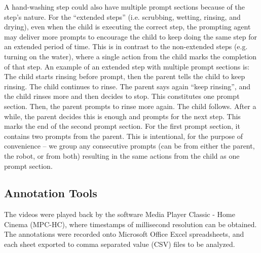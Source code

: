 \documentclass{ut-thesis}
\begin{document}
A hand-washing step could also have multiple prompt sections because of the step's nature.  For the ``extended steps'' (i.e. scrubbing, wetting, rinsing, and drying), even when the child is executing the correct step, the prompting agent may deliver more prompts to encourage the child to keep doing the same step for an extended period of time.  This is in contrast to the non-extended steps (e.g. turning on the water), where a single action from the child marks the completion of that step.  An example of an extended step with multiple prompt sections is: The child starts rinsing before prompt, then the parent tells the child to keep rinsing.  The child continues to rinse.  The parent says again ``keep rinsing'', and the child rinses more and then decides to stop.  This constitutes one prompt section.  Then, the parent prompts to rinse more again.  The child follows.  After a while, the parent decides this is enough and prompts for the next step.  This marks the end of the second prompt section.  For the first prompt section, it contains two prompts from the parent.  This is intentional, for the purpose of convenience -- we group any consecutive prompts (can be from either the parent, the robot, or from both) resulting in the same actions from the child as one prompt section.



\subsection{Annotation Tools}
The videos were played back by the software Media Player Classic - Home Cinema (MPC-HC), where timestamps of millisecond resolution can be obtained.  The annotations were recorded onto Microsoft Office Excel spreadsheets, and each sheet exported to comma separated value (CSV) files to be analyzed.
\end{document}
